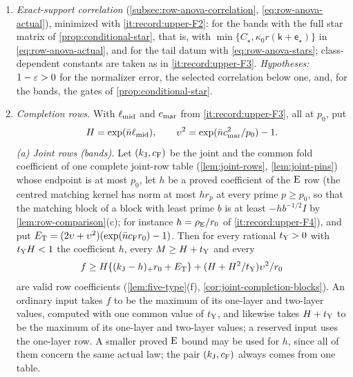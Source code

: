 \begin{enumerate}[label=\textup{(F\arabic*)}]
 count and $e^{\rm pin}_\varpi<\frac12$ for the pinned extraction
 (\cref{prop:pinned-extraction});
 $I_0=1-\binom n2\kappa r^2>\frac12$; $\eps_{\rm F},\eps_{\rm E}<\frac12$; every nonstar
 denominator positive.
\item\label{it:record:upper-F4} \emph{Exact-support correlation}
 (\cref{subsec:row-anova-correlation}, \eqref{eq:row-anova-actual}), minimized with
 \ref{it:record:upper-F2}: for the bands with the full star matrix of
 \cref{prop:conditional-star}, that is, with $\min\{C_\star,\kappa_0r(\mathsf k+\mathsf e_\star)\}$
 in \eqref{eq:row-anova-actual}, and for the tail datum with \eqref{eq:row-anova-stars};
 class-dependent constants are taken as in \ref{it:record:upper-F3}.
 \emph{Hypotheses:} $1-\eps>0$ for the normalizer error, the selected correlation below
 one, and, for the bands, the gates of \cref{prop:conditional-star}.
\item\label{it:record:upper-F5} \emph{Completion rows.} With $\ell_{\rm mid}$ and
 $c_{\rm mar}$ from \ref{it:record:upper-F3}, all at $p_0$, put
 \[
  H=\exp(\bar n\ell_{\rm mid}),\qquad \upsilon^2=\exp(\bar nc_{\rm mar}^2/p_0)-1 .
 \]
 \emph{(a) Joint rows (bands).} Let $(k_{\rm J},c_{\rm F})$ be the joint and the common
 fold coefficient of one complete joint-row table (\cref{lem:joint-rows},
 \cref{lem:joint-pins}) whose endpoint is at most $p_0$, let $h$ be a proved
 coefficient of the $\rm E$ row (the centred matching kernel has norm at most $hr_p$ at
 every prime $p\ge p_0$, so that the matching block of a block with least prime $b$ is
 at least $-hb^{-1/2}I$ by \cref{lem:row-comparison}(c); for instance
 $h=\rho_{\rm E}/r_0$ of \ref{it:record:upper-F4}), and put
 $E_{\rm T}=(2\upsilon+\upsilon^2)(\exp(\bar nc_{\rm F}r_0)-1)$. Then for every rational
 $t_{\rm Y}>0$ with $t_{\rm Y}H<1$ the coefficient $h$, every $M\ge H+t_{\rm Y}$ and
 every
 \[
  f\ge\frac{H\{(k_{\rm J}-h)_+r_0+E_{\rm T}\}+(H+H^2/t_{\rm Y})\upsilon^2}{r_0}
 \]
 are valid row coefficients (\cref{lem:five-type}(f),
 \cref{cor:joint-completion-blocks}). An ordinary input takes $f$ to be the maximum of its one-layer and two-layer values, computed with one common value of $t_{\rm Y}$, and likewise takes $H+t_{\rm Y}$ to be the maximum of its one-layer and two-layer values; a reserved
 input uses the one-layer row. A smaller proved $\rm E$ bound may be used for $h$,
 since all of them concern the same actual law; the pair $(k_{\rm J},c_{\rm F})$ always
 comes from one table.


\end{enumerate}
